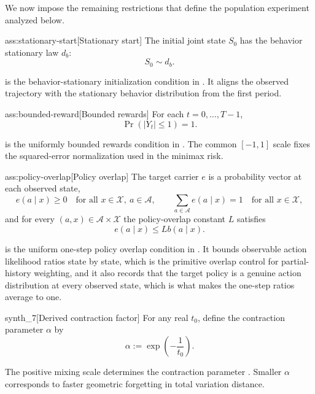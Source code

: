 \documentclass[11pt]{article}
\begin{document}
We now impose the remaining restrictions that define the population experiment analyzed below.

\begin{assumptionv}{ass:stationary-start}[Stationary start]
The initial joint state \(S_0\) has the behavior stationary law \(d_b\):
\[
S_0\sim d_b.
\]
\end{assumptionv}

 is the behavior-stationary initialization condition in \citet{HuWager2023}. It aligns the observed trajectory with the stationary behavior distribution from the first period.

\begin{assumptionv}{ass:bounded-reward}[Bounded rewards]
For each \(t=0,\ldots,T-1\),
\[
\Pr(|Y_t|\le 1)=1.
\]
\end{assumptionv}

 is the uniformly bounded rewards condition in \citet{HuWager2023}. The common \([-1,1]\) scale fixes the squared-error normalization used in the minimax risk.

\begin{assumptionv}{ass:policy-overlap}[Policy overlap]
The target carrier \(e\) is a probability vector at each observed state,
\[
e(a\mid x)\ge 0
\quad\text{for all }x\in\mathcal X,\ a\in\mathcal A,
\qquad
\sum_{a\in\mathcal A} e(a\mid x)=1
\quad\text{for all }x\in\mathcal X,
\]
and for every \((a,x)\in\mathcal A\times\mathcal X\) the policy-overlap constant \(L\) satisfies
\[
e(a\mid x)\le L b(a\mid x).
\]
\end{assumptionv}

 is the uniform one-step policy overlap condition in \citet{HuWager2023}. It bounds observable action likelihood ratios state by state, which is the primitive overlap control for partial-history weighting, and it also records that the target policy is a genuine action distribution at every observed state, which is what makes the one-step ratios average to one.

\begin{definitionv}{synth_7}[Derived contraction factor]
For any real \(t_0\), define the contraction parameter \(\alpha\) by
\[
\alpha := \exp\!\left(-\frac{1}{t_0}\right).
\]
\end{definitionv}

The positive mixing scale  determines the contraction parameter . Smaller \(\alpha\) corresponds to faster geometric forgetting in total variation distance.
\end{document}
